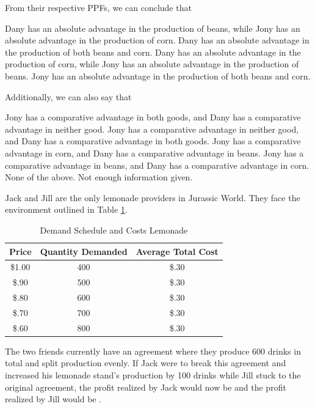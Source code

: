 \documentclass[addpoints,11pt]{exam}
\theoremstyle{definition}
\newcommand{\blank}[0]{\underline{\hspace{3cm}}}
\begin{document}
\begin{questions}
	
	\question \label{q18} From their respective PPFs, we can conclude that
	
	\begin{choices}
		\CorrectChoice Dany has an absolute advantage in the production of beans, while Jony has an absolute advantage in the production of corn.
		\choice Dany has an absolute advantage in the production of both beans and corn.
		\choice Dany has an absolute advantage in the production of corn, while Jony has an absolute advantage in the production of beans.
		\choice Jony has an absolute advantage in the production of both beans and corn.
	\end{choices}
	
	\question \label{q19} Additionally, we can also say that 
	
	\begin{choices}
		\choice Jony has a comparative advantage in both goods, and Dany has a comparative advantage in neither good.
		\choice Jony has a comparative advantage in neither good, and Dany has a comparative advantage in both goods.
		\CorrectChoice Jony has a comparative advantage in corn, and Dany has a comparative advantage in beans.
		\choice Jony has a comparative advantage in beans, and Dany has a comparative advantage in corn.
		\choice None of the above. Not enough information given.
	\end{choices}
	
\newpage
	
	\question Jack and Jill are the only lemonade providers in Jurassic World. They face the environment outlined in Table \ref{MC21}. 
	
	\begin{table}[H]
		\caption{Demand Schedule and Costs Lemonade}
		\centering
		\begin{tabular}{c|c|c}
			Price & Quantity Demanded & Average Total Cost \\
			\hline
			\$1.00 & 400 & \$.30\\
			\$.90 & 500 & \$.30\\
			\$.80 & 600 & \$.30 \\
			\$.70 & 700 & \$.30 \\
			\$.60 & 800 & \$.30 \\
		\end{tabular} 
		\label{MC21}
	\end{table}
	
	The two friends currently have an agreement where they produce 600 drinks in total and split production evenly. If Jack were to break this agreement and increased his lemonade stand's production by 100 drinks while Jill stuck to the original agreement, the profit realized by Jack would now be \blank and the profit realized by Jill would be \blank.
	

\end{questions}
\end{document}

